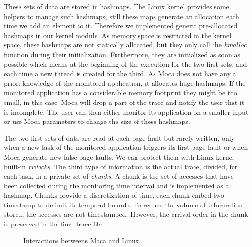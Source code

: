 These sets of data are stored in hashmaps.
The \gls{Linux} kernel provides some helpers to manage such hashmaps, still these maps generate an allocation each time we add an element to it.
Therefore we implemented generic pre-allocated hashmaps in our kernel module.
As memory space is restricted in the kernel space, these hashmaps are not statically allocated, but they only call the \emph{kmalloc} function during their initialization.
Furthermore, they are initialized as soon as possible which means at the beginning of the execution for the two first sets, and each time a new thread is created for the third.
As \gls{Moca} does not have any a priori knowledge of the monitored application, it allocates huge hashmaps.
If the monitored application has a considerable memory footprint they might be too small, in this case, \gls{Moca} will drop a part of the trace and notify the user that it is incomplete.
The user can then either monitor its application on a smaller input or  use \gls{Moca} parameters to change the size of these hashmaps.

The two first sets of data are read at each page fault but rarely written, only when a new task of the monitored application triggers its first page fault or when \gls{Moca} generate new false page faults.
We can protect them with Linux kernel built-in \emph{rwlocks}.
The third type of information is the actual trace, divided, for each task, in a private set of \emph{chunks}.
A chunk is the set of accesses that have been collected during the monitoring time interval and is implemented as a hashmap.
Chunks provide a discretization of time, each chunk embed two timestamp to delimit its temporal bounds.
To reduce the volume of information stored, the accesses are not timestamped.
However, the arrival order in the chunk is preserved in the final trace file.

\begin{figure}[htb]
    \centering
    
    \caption{Interactions betweens Moca and Linux.}
    \label{fig:moca}
\end{figure}

